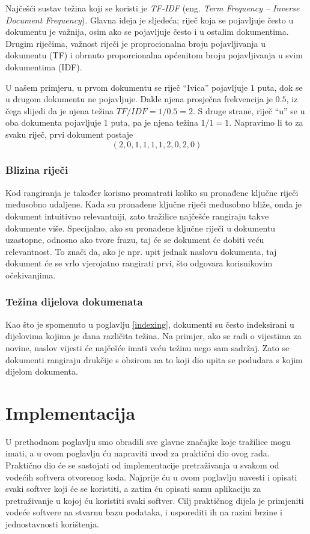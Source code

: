 \documentclass[a4paper,twoside,12pt]{scrreprt}
\begin{document}
Najčešći sustav težina koji se koristi je \textit{TF-IDF} (eng. \textit{Term Frequency – Inverse Document Frequency}). Glavna ideja je sljedeća; riječ koja se pojavljuje često u dokumentu je važnija, osim ako se pojavljuje često i u ostalim dokumentima. Drugim riječima, važnost riječi je proprocionalna broju pojavljivanja u dokumentu (TF) i obrnuto proporcionalna općenitom broju pojavljivanja u svim dokumentima (IDF).

U našem primjeru, u prvom dokumentu se riječ ``Ivica'' pojavljuje $1$ puta, dok se u drugom dokumentu ne pojavljuje. Dakle njena prosječna frekvencija je $0.5$, iz čega slijedi da je njena težina $TF / IDF = 1 / 0.5 = 2$. S druge strane, riječ ``u'' se u oba dokumenta pojavljuje 1 puta, pa je njena težina $1 / 1 = 1$. Napravimo li to za svaku riječ, prvi dokument postaje $$(2,0,1,1,1,1,2,0,2,0)$$

\subsection{Blizina riječi}

Kod rangiranja je također korisno promatrati koliko su pronađene ključne riječi međusobno udaljene. Kada su pronađene ključne riječi međusobno bliže, onda je dokument intuitivno relevantniji, zato tražilice najčešće rangiraju takve dokumente više. Specijalno, ako su pronađene ključne riječi u dokumentu uzastopne, odnosno ako tvore frazu, taj će se dokument će dobiti veću relevantnost. To znači da, ako je npr. upit jednak naslovu dokumenta, taj dokument će se vrlo vjerojatno rangirati prvi, što odgovara korisnikovim očekivanjima.

\subsection{Težina dijelova dokumenata}

Kao što je spomenuto u poglavlju \ref{indexing}, dokumenti su često indeksirani u dijelovima kojima je dana različita težina. Na primjer, ako se radi o vijestima za novine, naslov vijesti će najčešće imati veću težinu nego sam sadržaj. Zato se dokumenti rangiraju drukčije s obzirom na to koji dio upita se podudara s kojim dijelom dokumenta.


\chapter{Implementacija}

U prethodnom poglavlju smo obradili sve glavne značajke koje tražilice mogu imati, a u ovom poglavlju ću napraviti uvod za praktični dio ovog rada. Praktično dio će se sastojati od implementacije pretraživanja u svakom od vodećih softvera otvorenog koda. Najprije ću u ovom poglavlju navesti i opisati svaki softver koji će se koristiti, a zatim ću opisati samu aplikaciju za pretraživanje u kojoj ću koristiti svaki softver. Cilj praktičnog dijela je primjeniti vodeće softvere na stvarnu bazu podataka, i usporediti ih na razini brzine i jednostavnosti korištenja.
\end{document}
